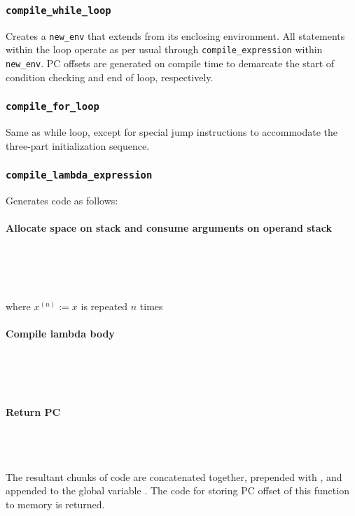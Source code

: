 \subsubsection{\texttt{compile\_while\_loop}}
Creates a \texttt{new\_env} that extends from its enclosing environment. All statements within the loop operate as per usual through \texttt{compile\_expression} within \texttt{new\_env}. PC offsets are generated on compile time to demarcate the start of condition checking and end of loop, respectively.

\subsubsection{\texttt{compile\_for\_loop}}
Same as while loop, except for special jump instructions to accommodate the three-part initialization sequence.

\subsubsection{\texttt{compile\_lambda\_expression}}
Generates code as follows: \\\\
\textbf{Allocate space on stack and consume arguments on operand stack}\\\\
\begin{prooftree}
\end{prooftree}\\\\\\
where $x^{(n)}:=x$ is repeated $n$ times\\\\
\textbf{Compile lambda body}\\\\
\begin{prooftree}
\end{prooftree}\\\\\\
\textbf{Return PC}\\\\
\begin{prooftree}
\end{prooftree}\\\\
The resultant chunks of code are concatenated together, prepended with , and appended to the global variable . The code for storing PC offset of this function to memory is returned.  

